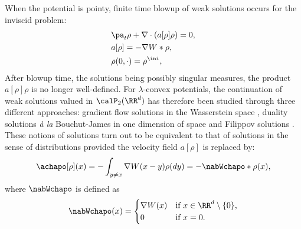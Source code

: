 When the potential is pointy, finite time blowup of weak solutions occurs \cite{BertozziBrandman, bertozzi09} for the inviscid problem:
\begin{subequations}\label{eq:agg}
\begin{align}
& \pa_t \rho + \nabla \cdot (a[\rho] \rho) = 0, \label{eq:rho} \\
& a[\rho] = - \nabla W * \rho, \label{eq:arho} \\
& \rho(0, \cdot) = \rho^{\ini}, \label{eq:rho0}
\end{align}
\end{subequations}
After blowup time, the solutions being possibly singular measures, the product $a[\rho] \rho$ is no longer well-defined. For $\lambda$-convex potentials, the continuation of weak solutions valued in $\calP_2(\RR^d)$ has therefore been studied through three different approaches: gradient flow solutions in the Wasserstein space \cite{figalli11}, duality solutions \textit{à la} Bouchut-James \cite{GF_dual_jv, JVChemotaxis} in one dimension of space and Filippov solutions \cite{cjlv15, lv17}. These notions of solutions turn out to be equivalent to that of solutions in the sense of distributions provided the velocity field $a[\rho]$ is replaced by:
\begin{equation}\label{eq:achapo}
\achapo[\rho](x) = -\int_{y \neq x} \nabla W(x-y) \rho(dy) = -\nabWchapo * \rho (x),
\end{equation}
where $\nabWchapo$ is defined as
\begin{equation*}%
\nabWchapo(x) = 
\begin{cases}
\nabla W(x) &\text{if } x \in \RR^d \setminus \{0\}, \\
0 &\text{if } x = 0.
\end{cases}
\end{equation*}

